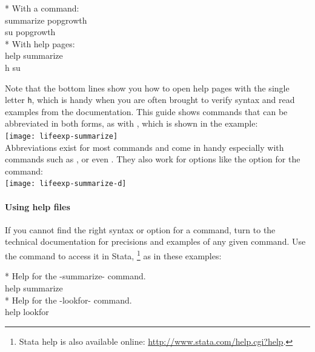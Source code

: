   	\begin{docspec}
  		* With a command:\\%
  		summarize popgrowth\\%
  		su popgrowth\\[1em]%
  		* With help pages:\\%
  		help summarize\\%
  		h su%
  	\end{docspec}%

  Note that the bottom lines show you how to open help pages with the single letter \texttt{h}, which is handy when you are often brought to verify syntax and read examples from the documentation. This guide shows commands that can be abbreviated in both forms, as with , which is shown in the example:\\[1em]%

  	\texttt{[image: lifeexp-summarize]}\\[1em]

  Abbreviations exist for most commands and come in handy especially with commands such as ,  or even . They also work for options like the  option for the  command:\\[1em]%

  	\texttt{[image: lifeexp-summarize-d]}\\[1em]
  
		\paragraph{Using help files}%

		If you cannot find the right syntax or option for a command, turn to the technical documentation for precisions and examples of any given command. Use the  command to access it in Stata,%
    		\footnote{Stata help is also available online: \url{http://www.stata.com/help.cgi?help}.} %
        as in these examples:%

		\begin{docspec}
			* Help for the -summarize- command.\\
			help summarize\\[1em]
	
			* Help for the -lookfor- command.\\
			help lookfor
		\end{docspec}

